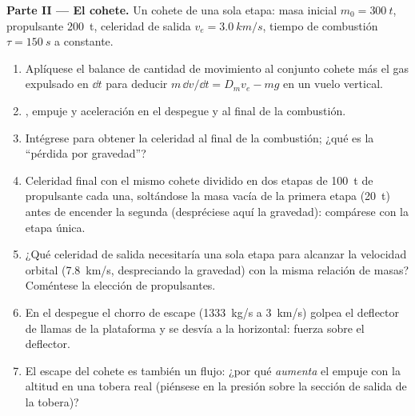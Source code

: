 \begin{problem}
\medskip
\noindent\textbf{Parte II --- El cohete.}
Un cohete de una sola etapa: masa inicial $m_0 = \qty{300}{t}$, propulsante
\qty{200}{t}, celeridad de salida $v_e = \qty{3.0}{km/s}$, tiempo de combustión $\tau =
\qty{150}{s}$ a  constante.
\begin{enumerate}[resume]
  \item Aplíquese el balance de cantidad de movimiento al conjunto cohete
        más el gas expulsado en $\dd t$ para deducir
        $m\,\dd v/\dd t = D_mv_e - mg$ en un vuelo vertical.
  \item {}, empuje y aceleración en el despegue y al final de
        la combustión.
  \item Intégrese para obtener la celeridad al final de la combustión;
        ¿qué es la ``pérdida por gravedad''?
  \item Celeridad final con el mismo cohete dividido en dos etapas de
        \qty{100}{t} de propulsante cada una, soltándose la masa vacía de
        la primera etapa (\qty{20}{t}) antes de encender la segunda
        (despréciese aquí la gravedad): compárese con la etapa única.
  \item ¿Qué celeridad de salida necesitaría una sola etapa para alcanzar
        la velocidad orbital (\qty{7.8}{km/s}, despreciando la gravedad)
        con la misma relación de masas? Coméntese la elección de
        propulsantes.
  \item En el despegue el chorro de escape (\qty{1333}{kg/s} a \qty{3}{km/s})
        golpea el deflector de llamas de la plataforma y se desvía a la
        horizontal: fuerza sobre el deflector.
  \item El escape del cohete es también un flujo: ¿por qué \emph{aumenta}
        el empuje con la altitud en una tobera real (piénsese en la
        presión sobre la sección de salida de la tobera)?
\end{enumerate}


\end{problem}
